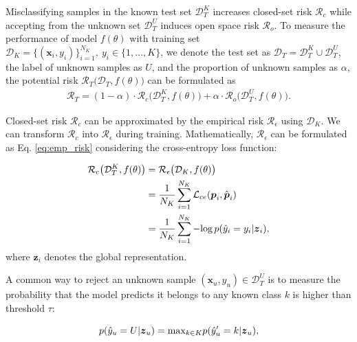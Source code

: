 \documentclass[letterpaper]{article} %
\begin{document}
Misclassifying samples in the known test set $\mathcal{D}_T^K$ increases closed-set risk $\mathcal{R}_c$ while accepting from the unknown set $\mathcal{D}_T^U$ induces open space risk $\mathcal{R}_o$. To measure the performance of model $f(\theta)$ with training set $\mathcal{D}_K=\{(\boldsymbol{x}_i, y_i)\}^{N_K}_{i=1},\ y_i\in\{1,...,K\}$, we denote the test set as $\mathcal{D}_T=\mathcal{D}_T^K\cup\mathcal{D}_T^U$, the label of unknown samples as $U$, and the proportion of unknown samples as $\alpha$, the potential risk $\mathcal{R}_T\big(\mathcal{D}_T,f(\theta)\big)$ can be formulated as
\begin{equation}
\begin{aligned}
    \mathcal{R}_T=(1-\alpha)\cdot\mathcal{R}_c\big(\mathcal{D}^K_T,f(\theta)\big)+\alpha\cdot\mathcal{R}_o\big(\mathcal{D}^U_T,f(\theta)\big).
\label{eq:base_target}
\end{aligned}
\end{equation}

Closed-set risk $\mathcal{R}_c$ can be approximated by the empirical risk $\mathcal{R}_\epsilon$ using $\mathcal{D}_K$. We can transform $\mathcal{R}_c$ into $\mathcal{R}_\epsilon$ during training. Mathematically, $\mathcal{R}_\epsilon$ can be formulated as Eq. \eqref{eq:emp_risk} considering the cross-entropy loss function:

\begin{equation}
\begin{aligned}
\mathcal{R}_c\big(\mathcal{D}^K_T,f(\theta)\big)&=\mathcal{R}_\epsilon\big(\mathcal{D}_K,f(\theta)\big)\\&=\frac1{N_K}\sum^{N_K}_{i=1}\mathcal{L}_{ce}(\boldsymbol{p}_i,\hat{\boldsymbol{p}}_i)\\&=\frac1{N_K}\sum^{N_K}_{i=1}-{\rm log}\,p(\hat{y}_i=y_i|\boldsymbol{z}_i),
\label{eq:emp_risk}
\end{aligned}
\end{equation}
where $\boldsymbol{z}_i$ denotes the global representation.

A common way to reject an unknown sample $(\boldsymbol{x}_u,y_u)\in\mathcal{D}_T^U$ is to measure the probability that the model predicts it belongs to any known class $k$ is higher than threshold $\tau$:

\begin{equation}
p(\hat{y}_u=U|\boldsymbol{z}_u)={\rm max}_{k\in K}p(\hat{y}'_u=k|\boldsymbol{z}_u),
\label{eq:prob_unknown}
\end{equation}
\end{document}
